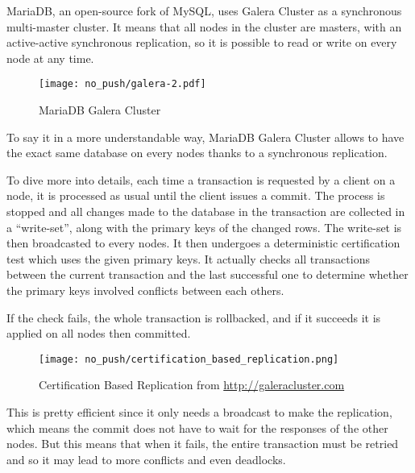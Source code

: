 MariaDB, an open-source fork of MySQL, uses Galera Cluster as a synchronous multi-master cluster. It means that all nodes in the cluster are masters, with an active-active synchronous replication, so it is possible to read or write on every node at any time.

\begin{figure}[H]
  \vspace{-10pt}
  \centering
  \centerline{\texttt{[image: no\_push/galera-2.pdf]}}
  \vspace{-5pt}
  \caption{MariaDB Galera Cluster}
  \vspace{-5pt}
  \label{fig:MGC}
\end{figure}

To say it in a more understandable way, MariaDB Galera Cluster allows to have the exact same database on every nodes thanks to a synchronous replication.

To dive more into details, each time a transaction is requested by a client on a node, it is processed as usual until the client issues a commit. The process is stopped and all changes made to the database in the transaction are collected in a ``write-set'', along with the primary keys of the changed rows. The write-set is then broadcasted to every nodes. It then undergoes a deterministic certification test which uses the given primary keys. It actually checks all transactions between the current transaction and the last successful one to determine whether the primary keys involved conflicts between each others.

If the check fails, the whole transaction is rollbacked, and if it succeeds it is applied on all nodes then committed.

\begin{figure}[H]
  \vspace{-10pt}
  \centering
  \centerline{\texttt{[image: no\_push/certification\_based\_replication.png]}}
  \vspace{-5pt}
  \caption{Certification Based Replication from \url{http://galeracluster.com} }
  \vspace{-5pt}
  \label{fig:certificationcommit}
\end{figure}


This is pretty efficient since it only needs a broadcast to make the replication, which means the commit does not have to wait for the responses of the other nodes. But this means that when it fails, the entire transaction must be retried and so it may lead to more conflicts and even deadlocks.


